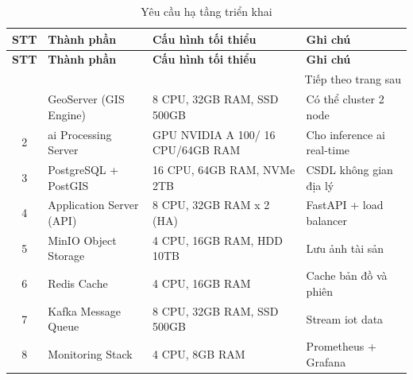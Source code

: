 \begin{longtable}{|c|p{4cm}|p{4cm}|p{4.5cm}|}
\caption{Yêu cầu hạ tầng triển khai \label{tab:phu_luc_3}} \\
\hline
\textbf{STT} & \textbf{Thành phần} & \textbf{Cấu hình tối thiểu} & \textbf{Ghi chú} \\ \hline
\endfirsthead
\hline
\textbf{STT} & \textbf{Thành phần} & \textbf{Cấu hình tối thiểu} & \textbf{Ghi chú} \\ \hline
\endhead
\hline
\multicolumn{4}{r}{{Tiếp theo trang sau}} \\
\endfoot
\hline
\endlastfoot
1 & GeoServer (GIS Engine) & 8 CPU, 32GB RAM, SSD 500GB & Có thể cluster 2 node \\ \hline
2 & \gls{ai} Processing Server & GPU NVIDIA A 100/ 16 CPU/64GB RAM & Cho inference \gls{ai} real-time \\ \hline
3 & PostgreSQL + PostGIS & 16 CPU, 64GB RAM, NVMe 2TB & CSDL không gian địa lý \\ \hline
4 & Application Server (API) & 8 CPU, 32GB RAM x 2 (HA) & FastAPI + load balancer \\ \hline
5 & MinIO Object Storage & 4 CPU, 16GB RAM, HDD 10TB & Lưu ảnh tài sản \\ \hline
6 & Redis Cache & 4 CPU, 16GB RAM & Cache bản đồ và phiên \\ \hline
7 & Kafka Message Queue & 8 CPU, 32GB RAM, SSD 500GB & Stream \gls{iot} data \\ \hline
8 & Monitoring Stack & 4 CPU, 8GB RAM & Prometheus + Grafana \\ \hline
\end{longtable}